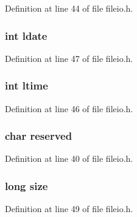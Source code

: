 Definition at line 44 of file fileio.\-h.

\hypertarget{struct_d_i_r_t_a_b_l_e_a08fb29f289dd4dbf79209f9b9575b62d}{
\subsubsection[{ldate}]{\setlength{\rightskip}{0pt plus 5cm}int ldate}}\label{struct_d_i_r_t_a_b_l_e_a08fb29f289dd4dbf79209f9b9575b62d}


Definition at line 47 of file fileio.\-h.

\hypertarget{struct_d_i_r_t_a_b_l_e_acdb6339b42a1861122e85f50ffe8f9f8}{
\subsubsection[{ltime}]{\setlength{\rightskip}{0pt plus 5cm}int ltime}}\label{struct_d_i_r_t_a_b_l_e_acdb6339b42a1861122e85f50ffe8f9f8}


Definition at line 46 of file fileio.\-h.

\hypertarget{struct_d_i_r_t_a_b_l_e_afbdb0ad610aca15517b193c2c5ec7791}{
\subsubsection[{reserved}]{\setlength{\rightskip}{0pt plus 5cm}char reserved}}\label{struct_d_i_r_t_a_b_l_e_afbdb0ad610aca15517b193c2c5ec7791}


Definition at line 40 of file fileio.\-h.

\hypertarget{struct_d_i_r_t_a_b_l_e_a37363161b41c4165b98cba7abc7a9d95}{
\subsubsection[{size}]{\setlength{\rightskip}{0pt plus 5cm}long size}}\label{struct_d_i_r_t_a_b_l_e_a37363161b41c4165b98cba7abc7a9d95}


Definition at line 49 of file fileio.\-h.



